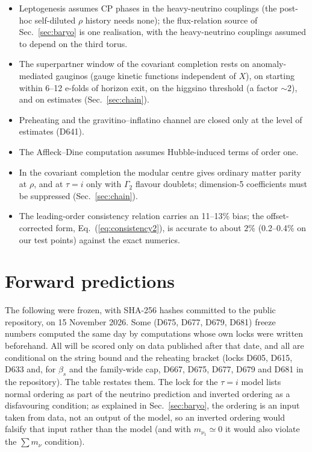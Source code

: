 \documentclass[aps,prd,twocolumn,superscriptaddress,nofootinbib,floatfix]{revtex4-2}
\begin{document}
\begin{itemize}
\item Leptogenesis assumes CP phases in the heavy-neutrino couplings (the post-hoc self-diluted $\rho$ history needs none); the flux-relation source of Sec.~\ref{sec:baryo} is one realisation, with the heavy-neutrino couplings assumed to depend on the third torus.
\item The superpartner window of the covariant completion rests on anomaly-mediated gauginos (gauge kinetic functions independent of $X$), on starting within 6--12 e-folds of horizon exit, on the higgsino threshold (a factor $\sim2$), and on estimates (Sec.~\ref{sec:chain}).
\item Preheating and the gravitino--inflatino channel are closed only at the level of estimates (D641).
\item The Affleck--Dine computation assumes Hubble-induced terms of order one.
\item In the covariant completion the modular centre gives ordinary matter parity at $\rho$, and at $\tau=i$ only with $\Gamma_2$ flavour doublets; dimension-5 coefficients must be suppressed (Sec.~\ref{sec:chain}).
\item The leading-order consistency relation carries an 11--13\% bias; the offset-corrected form, Eq.~(\ref{eq:consistency2}), is accurate to about $2\%$ (0.2--0.4\% on our test points) against the exact numerics.
\end{itemize}

\section{Forward predictions}\label{sec:forward}
The following were frozen, with SHA-256 hashes committed to the public repository, on 15 November 2026. Some (D675, D677, D679, D681) freeze numbers computed the same day by computations whose own locks were written beforehand. All will be scored only on data published after that date, and all are conditional on the string bound and the reheating bracket (locks D605, D615, D633 and, for $\beta_s$ and the family-wide cap, D667, D675, D677, D679 and D681 in the repository). The table restates them. The lock for the $\tau=i$ model lists normal ordering as part of the neutrino prediction and inverted ordering as a disfavouring condition; as explained in Sec.~\ref{sec:baryo}, the ordering is an input taken from data, not an output of the model, so an inverted ordering would falsify that input rather than the model (and with $m_{\nu_1}\simeq0$ it would also violate the $\sum m_\nu$ condition).
\end{document}

